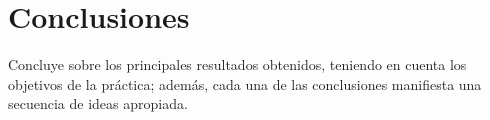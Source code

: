 \documentclass[twocolumn,a4paper,11pt]{scrartcl}
\begin{document}
\section{Conclusiones}
Concluye sobre los principales resultados obtenidos, teniendo en cuenta los objetivos de la práctica; además, cada una de las conclusiones manifiesta una secuencia de ideas apropiada.


\end{document}
